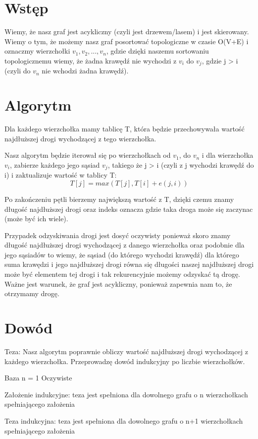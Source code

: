 \documentclass[12pt,a4paper]{article}
\begin{document}
\section{Wstęp}
Wiemy, że nasz graf jest acykliczny (czyli jest drzewem/lasem) i jest skierowany. Wiemy o tym, że możemy nasz graf posortować  topologiczne w czasie O(V+E) i oznaczmy wierzchołki $v_1, v_2, ..., v_n$, gdzie dzięki naszemu sortowaniu topologicznemu wiemy, że żadna krawędź nie wychodzi z $v_i$ do $v_j$, gdzie j > i (czyli do $v_n$ nie wchodzi żadna krawędź). 

\section{Algorytm}
Dla każdego wierzchołka mamy tablicę T, która będzie przechowywała wartość najdłuższej drogi wychodzącej z tego wierzchołka. 

Nasz algorytm będzie iterował się po wierzchołkach od $v_1$, do $v_n$ i dla wierzchołka $v_i$, zabierze każdego jego sąsiad $v_j$, takiego że j > i (czyli z j wychodzi krawędź do i) i zaktualizuje wartość w tablicy T:
$$ T[j] = max(T[j], T[i] + e(j,i))$$

Po zakończeniu pętli bierzemy największą wartość z T, dzięki czemu znamy długość najdłuższej drogi oraz indeks oznacza gdzie taka droga może się zaczynac (może być ich wiele).

Przypadek odzyskiwania drogi jest dosyć oczywisty ponieważ skoro znamy długość najdłuższej drogi wychodzącej z danego wierzchołka oraz podobnie dla jego sąsiadów to wiemy, że sąsiad (do którego wychodzi krawędź) dla którego suma krawędzi i jego najdłuższej drogi równa się długości naszej najdłuższej drogi może być elementem tej drogi i tak rekurencyjnie możemy odzyskać tą drogę. Ważne jest warunek, że graf jest acykliczny, ponieważ zapewnia nam to, że otrzymamy drogę.

\section{Dowód}
Teza: Nasz algorytm poprawnie obliczy wartość najdłuższej drogi wychodzącej z każdego wierzchołka.
Przeprowadzę dowód indukcyjny po liczbie wierzchołków.

Baza n = 1
Oczywiste

Założenie indukcyjne: teza jest spełniona dla dowolnego grafu o n wierzchołkach spełniającego założenia

Teza indukcyjna: teza jest spełniona dla dowolnego grafu o n+1 wierzchołkach spełniającego założenia
\end{document}
